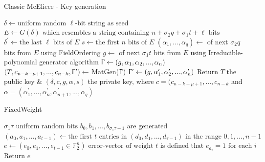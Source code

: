 \documentclass[11pt,
  oneside,openany,    %
]{scrreprt}
\begin{document}
\begin{algorithm}[H]
\caption{Classic McEliece - Key generation}\label{alg:two}

$\delta \gets \text{uniform random } \ell \text{-bit string as seed}$\;
$E \gets G(\delta) \text{ which resembles a string containing } n+\sigma_{2}q + \sigma_{1}t + \ell \text{ bits}$\;
$\delta^{\prime} \gets \text{the last } \ell \text{ bits of } E$\;
$s \gets \text{the first $n$ bits of $E$}$\;
$(\alpha_{1},..., \alpha_{q}) \gets$ of next $\sigma_{2}q$ bits from $E$ using FieldOrdering\;
$g \gets $ of next $\sigma_{1}t$ bits from $E$ using Irreducible-polynomial generator algorithm\;
$\Upgamma \gets (g, \alpha_{1}, \alpha_{2},..., \alpha_{n})$ \;
$(T, c_{n-k-\mu+1},...,c_{n-k}, \Upgamma^{\prime}) \gets$ MatGen($\Upgamma$)\;
$\Upgamma^{\prime} \gets (g, \alpha^{\prime}_{1}, \alpha^{\prime}_{2},..., \alpha^{\prime}_{n})$\;
Return $T$ the public key \& $(\delta, c, g, \alpha, s)$ the private key, where $c=(c_{n-k-\mu+1},...,c_{n-k}$ and $\alpha=(\alpha^{\prime}_{1},...,\alpha^{\prime}_{n}, \alpha^{\prime}_{n+1},...,\alpha_{q})$\;
\end{algorithm}

\begin{algorithm}[H]
\caption{FixedWeight}\label{alg:fixedweight}
$\sigma_{1}\tau \text{ uniform random bits $b_{0},b_{1},...,b_{\sigma_{1}\tau - 1}$ are generated}$\;
$(a_{0},a_{1},...,a_{t - 1}) \gets \text{the first $t$ entries in $(d_{0},d_{1},...,d_{\tau - 1})$ in the range ${0,1,...,n-1}$}$\;
$e \gets (e_{0},e_{1},...,e_{t - 1} \in \mathbb{F}^{n}_{2}) \text{ error-vector of weight $t$ is defined that $e_{a_{i}} = 1$ for each $i$}$\;
Return $e$\;
\end{algorithm}
\end{document}
